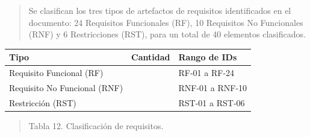 \documentclass[
]{article}
\newcounter{none} %
\begin{document}
\begin{quote}
Se clasifican los tres tipos de artefactos de requisitos identificados
en el documento: 24 Requisitos Funcionales (RF), 10 Requisitos No
Funcionales (RNF) y 6 Restricciones (RST), para un total de 40 elementos
clasificados.
\end{quote}

{\def\LTcaptype{none} %
\begin{longtable}[]{@{}
  >{\centering\arraybackslash}p{}
  >{\centering\arraybackslash}p{}
  >{\centering\arraybackslash}p{}@{}}
\toprule\noalign{}
\begin{minipage}[b]{\linewidth}\centering
\textbf{Tipo}
\end{minipage} & \begin{minipage}[b]{\linewidth}\centering
\textbf{Cantidad}
\end{minipage} & \begin{minipage}[b]{\linewidth}\centering
\textbf{Rango de IDs}
\end{minipage} \\
\midrule\noalign{}
\endhead
\bottomrule\noalign{}
\endlastfoot
Requisito Funcional (RF) & 24 & RF-01 a RF-24 \\
Requisito No Funcional (RNF) & 10 & RNF-01 a RNF-10 \\
Restricción (RST) & 6 & RST-01 a RST-06 \\
\end{longtable}
}

\begin{quote}
\protect{}\label{_bookmark61}{}Tabla 12. Clasificación de
requisitos.
\end{quote}
\end{document}
